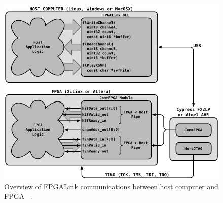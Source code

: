 \begin{figure}[h]
	\begin{center}
		\includegraphics[width=150mm]{figures/fpgalinkOverview.png}
		\captionfonts
		\caption{Overview of FPGALink communications between host computer and FPGA ~\cite{fpgalink}.}
		\label{fig:fpgalink}
	\end{center}
\end{figure}
